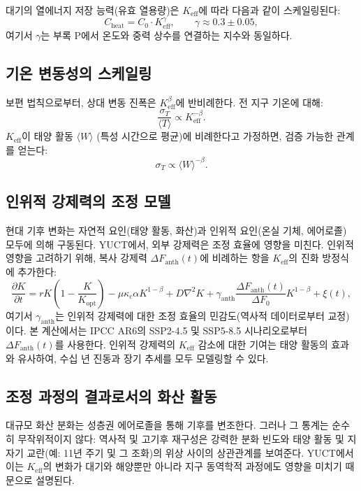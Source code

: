 \documentclass[11pt,a4paper]{article}
\newcommand{\Keff}{K_{\mathrm{eff}}}
\newcommand{\be}{\beta}
\newcommand{\ga}{\gamma}
\begin{document}
	대기의 열에너지 저장 능력(유효 열용량)은 $\Keff$에 따라 다음과 같이 스케일링된다:
	\[
	C_{\text{heat}} = C_0 \cdot \Keff^{\ga}, \qquad \ga \approx 0.3 \pm 0.05,
	\]
	여기서 $\ga$는 부록 P에서 온도와 중력 상수를 연결하는 지수와 동일하다.
	
	\subsection{기온 변동성의 스케일링}
	
	보편 법칙으로부터, 상대 변동 진폭은 $\Keff^{\be}$에 반비례한다. 전 지구 기온에 대해:
	\[
	\frac{\sigma_T}{\langle T \rangle} \propto \Keff^{-\be}.
	\]
	$\Keff$이 태양 활동 $\langle W \rangle$ (특성 시간으로 평균)에 비례한다고 가정하면, 검증 가능한 관계를 얻는다:
	\[
	\sigma_T \propto \langle W \rangle^{-\be}.
	\]
	
	\subsection{인위적 강제력의 조정 모델}
	
	현대 기후 변화는 자연적 요인(태양 활동, 화산)과 인위적 요인(온실 기체, 에어로졸) 모두에 의해 구동된다. YUCT에서, 외부 강제력은 조정 효율에 영향을 미친다. 인위적 영향을 고려하기 위해, 복사 강제력 $\Delta F_{\mathrm{anth}}(t)$에 비례하는 항을 $K_{\mathrm{eff}}$의 진화 방정식에 추가한다:
	\[
	\frac{\partial K}{\partial t} = r K \left(1 - \frac{K}{K_{\mathrm{opt}}}\right) - \mu \kappa_c \alpha K^{1-\beta} 
	+ D\nabla^2 K + \gamma_{\mathrm{anth}} \frac{\Delta F_{\mathrm{anth}}(t)}{\Delta F_0} K^{1-\beta} + \xi(t),
	\]
	여기서 $\gamma_{\mathrm{anth}}$는 인위적 강제력에 대한 조정 효율의 민감도(역사적 데이터로부터 교정)이다. 본 계산에서는 IPCC AR6의 SSP2-4.5 및 SSP5-8.5 시나리오로부터 $\Delta F_{\mathrm{anth}}(t)$를 사용한다. 인위적 강제력의 $K_{\mathrm{eff}}$ 감소에 대한 기여는 태양 활동의 효과와 유사하여, 수십 년 진동과 장기 추세를 모두 모델링할 수 있다.
	
	\subsection{조정 과정의 결과로서의 화산 활동}
	
	대규모 화산 분화는 성층권 에어로졸을 통해 기후를 변조한다. 그러나 그 통계는 순수히 무작위적이지 않다: 역사적 및 고기후 재구성은 강력한 분화 빈도와 태양 활동 및 지자기 교란(예: 11년 주기 및 그 조화)의 위상 사이의 상관관계를 보여준다. YUCT에서 이는 $\Keff$의 변화가 대기와 해양뿐만 아니라 지구 동역학적 과정에도 영향을 미치기 때문으로 설명된다.
	
\end{document}
